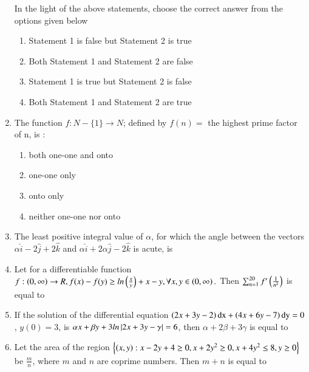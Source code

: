 \documentclass[journal]{IEEEtran}
\begin{document}
\begin{enumerate}[start=16]
In the light of the above statements, choose the correct answer from the options given below
\begin{enumerate}
    \item Statement 1 is false but Statement 2 is true
    \item Both Statement 1 and Statement 2 are false
    \item Statement 1 is true but Statement 2 is false
    \item Both Statement 1 and Statement 2 are true
\end{enumerate}

\item The function $f  : N-{\{1}\}\rightarrow N$; defined by $f(n)=$ the highest prime factor of n, is :
\begin{enumerate}
    \item both one-one and onto
    \item one-one only
    \item onto only
    \item neither one-one nor onto
\end{enumerate}
  
\item The least positive integral value of $\alpha$, for which the angle between the vectors $\alpha\hat{i}-2\hat{j}+2\hat{k}$ and $\alpha\hat{i}+2\alpha\hat{j}-2\hat{k}$ is acute, is \underline{\hspace{1cm}}\\

\item Let for a differentiable function $f : \left(0, \infty\right)\rightarrow R, f(x)-f(y)\geq ln\left(\frac{x}{y}\right)+x-y,\forall x,y \in\left(0,\infty\right).$ Then $\sum_{n=1}^{20}f'\left(\frac{1}{n^2}\right)$ is equal to \underline{\hspace{1cm}}\\

\item If the solution of the differential equation $\left(2x+3y-2\right)\text{dx}+\left(4x+6y-7\right)\text{dy}=0$, $y(0)=3$, is $\alpha x+\beta y+3 ln\left\vert2x+3y-\gamma\right\vert=6$, then $\alpha+2\beta+3\gamma$ is equal to \underline{\hspace{1cm}}\\

\item Let the area of the region $\left\{\left(x,y\right): x-2y+4\geq 0,x+2y^2\geq 0,x+4y^2\leq 8,y\geq 0\right\}$ be $\frac{m}{n}$, where $m$ and $n$ are coprime numbers. Then $m+n$ is equal to \underline{\hspace{1cm}}\\


\end{enumerate}
\end{document}
